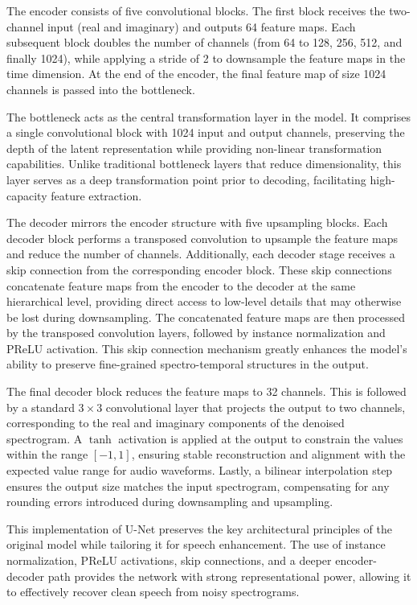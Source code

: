The encoder consists of five convolutional blocks. The first block receives the two-channel input (real and imaginary) and outputs 64 feature maps. Each subsequent block doubles the number of channels (from 64 to 128, 256, 512, and finally 1024), while applying a stride of 2 to downsample the feature maps in the time dimension. At the end of the encoder, the final feature map of size 1024 channels is passed into the bottleneck.

The bottleneck acts as the central transformation layer in the model. It comprises a single convolutional block with 1024 input and output channels, preserving the depth of the latent representation while providing non-linear transformation capabilities. Unlike traditional bottleneck layers that reduce dimensionality, this layer serves as a deep transformation point prior to decoding, facilitating high-capacity feature extraction.

The decoder mirrors the encoder structure with five upsampling blocks. Each decoder block performs a transposed convolution to upsample the feature maps and reduce the number of channels. Additionally, each decoder stage receives a skip connection from the corresponding encoder block. These skip connections concatenate feature maps from the encoder to the decoder at the same hierarchical level, providing direct access to low-level details that may otherwise be lost during downsampling. The concatenated feature maps are then processed by the transposed convolution layers, followed by instance normalization and PReLU activation. This skip connection mechanism greatly enhances the model’s ability to preserve fine-grained spectro-temporal structures in the output.

The final decoder block reduces the feature maps to 32 channels. This is followed by a standard $3 \times 3$ convolutional layer that projects the output to two channels, corresponding to the real and imaginary components of the denoised spectrogram. A $\tanh$ activation is applied at the output to constrain the values within the range \([-1, 1]\), ensuring stable reconstruction and alignment with the expected value range for audio waveforms. Lastly, a bilinear interpolation step ensures the output size matches the input spectrogram, compensating for any rounding errors introduced during downsampling and upsampling.

This implementation of U-Net preserves the key architectural principles of the original model while tailoring it for speech enhancement. The use of instance normalization, PReLU activations, skip connections, and a deeper encoder-decoder path provides the network with strong representational power, allowing it to effectively recover clean speech from noisy spectrograms.

